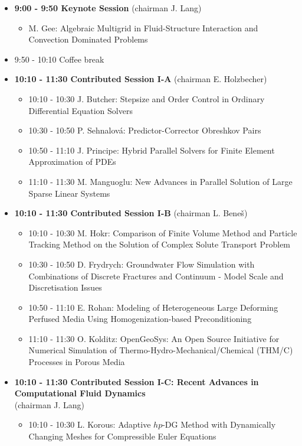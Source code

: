 \documentclass[10pt, A4]{article}%
\begin{document}
\begin{itemize}    
  \item {\bf 9:00 - 9:50 Keynote Session} (chairman J. Lang) 
  \begin{itemize}
    \item M. Gee: Algebraic Multigrid in Fluid-Structure Interaction and Convection Dominated Problems
  \end{itemize}
  \item 9:50 - 10:10 Coffee break
  \item {\bf 10:10 - 11:30 Contributed Session I-A} (chairman E. Holzbecher) 
  \begin{itemize}
    \item 10:10 - 10:30 J. Butcher: Stepsize and Order Control in Ordinary Differential Equation Solvers
    \item 10:30 - 10:50 P. Sehnalov\'{a}: Predictor-Corrector Obreshkov Pairs
    \item 10:50 - 11:10 J. Principe: Hybrid Parallel Solvers for Finite Element Approximation of PDEs
    \item 11:10 - 11:30 M. Manguoglu: New Advances in Parallel Solution of Large Sparse Linear Systems
  \end{itemize}
  \item {\bf 10:10 - 11:30 Contributed Session I-B} (chairman L. Bene\v{s}) 
  \begin{itemize}
    \item 10:10 - 10:30 M. Hokr: Comparison of Finite Volume Method and Particle Tracking Method on the Solution of Complex Solute Transport Problem
    \item 10:30 - 10:50 D. Frydrych: Groundwater Flow Simulation with Combinations of Discrete Fractures and Continuum - Model Scale and Discretisation Issues
    \item 10:50 - 11:10 E. Rohan: Modeling of Heterogeneous Large Deforming Perfused Media Using Homogenization-based Preconditioning
    \item 11:10 - 11:30 O. Kolditz: OpenGeoSys: An Open Source Initiative for Numerical Simulation of Thermo-Hydro-Mechanical/Chemical (THM/C) Processes in Porous Media
  \end{itemize}
  \item {\bf 10:10 - 11:30 Contributed Session I-C: Recent Advances in Computational Fluid Dynamics} \\(chairman J. Lang) 
  \begin{itemize}
    \item 10:10 - 10:30 L. Korous: Adaptive $hp$-DG Method with Dynamically Changing Meshes for Compressible Euler Equations

\end{itemize}
\end{itemize}
\end{document}
